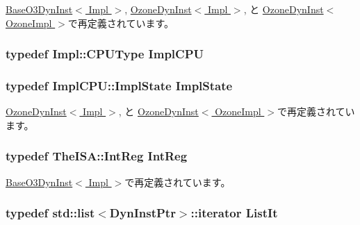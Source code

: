 \hyperlink{classBaseO3DynInst_a75484259f1855aabc8d74c6eb1cfe186}{BaseO3DynInst$<$ Impl $>$}, \hyperlink{classOzoneDynInst_a75484259f1855aabc8d74c6eb1cfe186}{OzoneDynInst$<$ Impl $>$}, と \hyperlink{classOzoneDynInst_a75484259f1855aabc8d74c6eb1cfe186}{OzoneDynInst$<$ OzoneImpl $>$}で再定義されています。\hypertarget{classBaseDynInst_a9792f311b2805cbefb8cb15c1c4a4cf5}{
\subsubsection[{ImplCPU}]{\setlength{\rightskip}{0pt plus 5cm}typedef Impl::CPUType {\bf ImplCPU}}}
\label{classBaseDynInst_a9792f311b2805cbefb8cb15c1c4a4cf5}
\hypertarget{classBaseDynInst_a767a9d57347239b1c904738bbd7796fa}{
\subsubsection[{ImplState}]{\setlength{\rightskip}{0pt plus 5cm}typedef ImplCPU::ImplState {\bf ImplState}}}
\label{classBaseDynInst_a767a9d57347239b1c904738bbd7796fa}


\hyperlink{classOzoneDynInst_af74382499244d5cf3961ff5eaf314518}{OzoneDynInst$<$ Impl $>$}, と \hyperlink{classOzoneDynInst_af74382499244d5cf3961ff5eaf314518}{OzoneDynInst$<$ OzoneImpl $>$}で再定義されています。\hypertarget{classBaseDynInst_a1355cb78d031430d4d70eb5080267604}{
\subsubsection[{IntReg}]{\setlength{\rightskip}{0pt plus 5cm}typedef TheISA::IntReg {\bf IntReg}}}
\label{classBaseDynInst_a1355cb78d031430d4d70eb5080267604}


\hyperlink{classBaseO3DynInst_a1355cb78d031430d4d70eb5080267604}{BaseO3DynInst$<$ Impl $>$}で再定義されています。\hypertarget{classBaseDynInst_a184cb829e22cc656acb41864f68f51ea}{
\subsubsection[{ListIt}]{\setlength{\rightskip}{0pt plus 5cm}typedef {\bf std::list}$<${\bf DynInstPtr}$>$::iterator {\bf ListIt}}}
\label{classBaseDynInst_a184cb829e22cc656acb41864f68f51ea}


